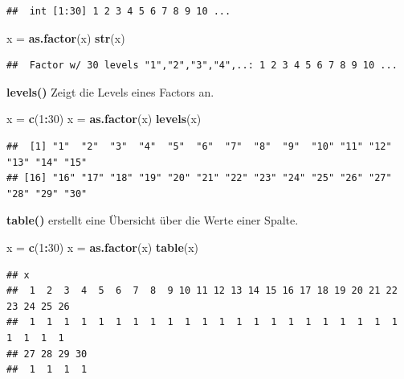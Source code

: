 \documentclass[]{book}
\newenvironment{Shaded}{\begin{snugshade}}{\end{snugshade}}
\newcommand{\KeywordTok}[1]{\textcolor[rgb]{0.13,0.29,0.53}{\textbf{#1}}}
\newcommand{\DecValTok}[1]{\textcolor[rgb]{0.00,0.00,0.81}{#1}}
\newcommand{\StringTok}[1]{\textcolor[rgb]{0.31,0.60,0.02}{#1}}
\newcommand{\OperatorTok}[1]{\textcolor[rgb]{0.81,0.36,0.00}{\textbf{#1}}}
\newcommand{\NormalTok}[1]{#1}
\begin{document}
\begin{verbatim}
##  int [1:30] 1 2 3 4 5 6 7 8 9 10 ...
\end{verbatim}

\begin{Shaded}
\begin{Highlighting}[]
\NormalTok{x =}\StringTok{ }\KeywordTok{as.factor}\NormalTok{(x)}
\KeywordTok{str}\NormalTok{(x)}
\end{Highlighting}
\end{Shaded}

\begin{verbatim}
##  Factor w/ 30 levels "1","2","3","4",..: 1 2 3 4 5 6 7 8 9 10 ...
\end{verbatim}

\textbf{levels()} Zeigt die Levels eines Factors an.

\begin{Shaded}
\begin{Highlighting}[]
\NormalTok{x =}\StringTok{ }\KeywordTok{c}\NormalTok{(}\DecValTok{1}\OperatorTok{:}\DecValTok{30}\NormalTok{)}
\NormalTok{x =}\StringTok{ }\KeywordTok{as.factor}\NormalTok{(x)}
\KeywordTok{levels}\NormalTok{(x)}
\end{Highlighting}
\end{Shaded}

\begin{verbatim}
##  [1] "1"  "2"  "3"  "4"  "5"  "6"  "7"  "8"  "9"  "10" "11" "12" "13" "14" "15"
## [16] "16" "17" "18" "19" "20" "21" "22" "23" "24" "25" "26" "27" "28" "29" "30"
\end{verbatim}

\textbf{table()} erstellt eine Übersicht über die Werte einer Spalte.

\begin{Shaded}
\begin{Highlighting}[]
\NormalTok{x =}\StringTok{ }\KeywordTok{c}\NormalTok{(}\DecValTok{1}\OperatorTok{:}\DecValTok{30}\NormalTok{)}
\NormalTok{x =}\StringTok{ }\KeywordTok{as.factor}\NormalTok{(x)}
\KeywordTok{table}\NormalTok{(x)}
\end{Highlighting}
\end{Shaded}

\begin{verbatim}
## x
##  1  2  3  4  5  6  7  8  9 10 11 12 13 14 15 16 17 18 19 20 21 22 23 24 25 26 
##  1  1  1  1  1  1  1  1  1  1  1  1  1  1  1  1  1  1  1  1  1  1  1  1  1  1 
## 27 28 29 30 
##  1  1  1  1
\end{verbatim}
\end{document}
